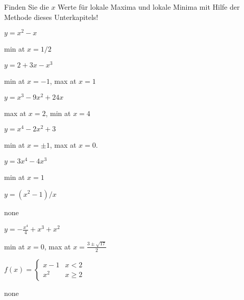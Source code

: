 \begin{exercises} 
\noindent Finden Sie die $x$ Werte für lokale Maxima und lokale Minima mit Hilfe der Methode dieses Unterkapitels! 

\twocol
\begin{exercise} $y=x^2-x$ 
\begin{answer} min at $x=1/2$
\end{answer}\end{exercise}

\begin{exercise} $y=2+3x-x^3$ 
\begin{answer} min at $x=-1$, max at $x=1$
\end{answer}\end{exercise}

\begin{exercise} $y=x^3-9x^2+24x$
\begin{answer} max at $x=2$, min at $x=4$
\end{answer}\end{exercise}

\begin{exercise} $y=x^4-2x^2+3$ 
\begin{answer} min at $x=\pm 1$, max at $x=0$.
\end{answer}\end{exercise}

\begin{exercise} $y=3x^4-4x^3$
\begin{answer} min at $x=1$
\end{answer}\end{exercise}

\begin{exercise} $y=(x^2-1)/x$
\begin{answer} none
\end{answer}\end{exercise}

\begin{exercise} $y=-\frac{x^4}{4}+x^3+x^2$ 
\begin{answer} min at $x=0$, max at $x=\frac{3\pm \sqrt{17}}{2}$
\end{answer}\end{exercise}

\begin{exercise} $f(x) = \begin{cases} x-1 & x < 2  \\
x^2 & x\geq 2 \end{cases}$
\begin{answer} none
\end{answer}\end{exercise}


\end{exercises}
